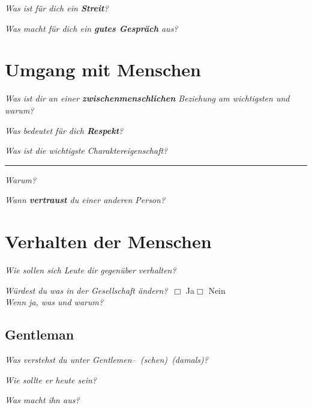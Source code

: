 \documentclass[a4paper,12pt]{scrartcl}
\newcommand{\checkbox}{\(\Box\)}
\newcommand{\hfilloutline}[1]{\rule{#1}{0.5pt}}
\newcommand{\frage}[1]{\textit{#1}}
\renewcommand{\emph}[1]{\textbf{#1}}
\begin{document}
\frage{Was ist für dich ein \emph{Streit}?}
\vspace{3cm}

\frage{Was macht für dich ein \emph{gutes Gespräch} aus?}
\vspace{4cm}


\newpage

   



\section*{Umgang mit Menschen}

\frage{Was ist dir an einer \emph{zwischenmenschlichen} Beziehung am wichtigsten und warum?}
\vspace{4cm}


\frage{Was bedeutet für dich \emph{Respekt}?}
\vspace{3cm}


\frage{Was ist die wichtigste Charaktereigenschaft?} \hfill\hfilloutline{7.5cm}
\frage{Warum?}
\vspace{2cm}



\frage{Wann \emph{vertraust} du einer anderen Person?}
\newpage




\section*{Verhalten der Menschen}

\frage{Wie sollen sich Leute dir gegenüber verhalten?}
\vspace{2cm}


\frage{Würdest du was in der Gesellschaft ändern?}\ \checkbox{} Ja\hspace{0.8cm}\checkbox{} Nein\\
\frage{Wenn ja, was und warum?}
\vspace{3cm}

\subsection*{Gentleman}
\frage{Was verstehst du unter Gentlemen--\ (schen)\ (damals)?}
\vspace{2cm} 

\frage{Wie sollte er heute sein?}
\vspace{2cm}

\frage{Was macht ihn aus?}
\vspace{2cm}
\end{document}
